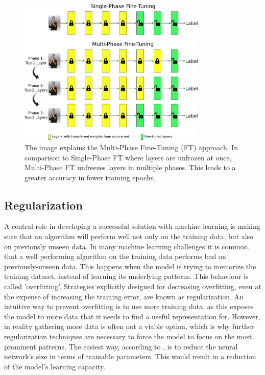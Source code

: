 \begin{figure}[H]
  \begin{center}
  \includegraphics[angle=0, width=0.8\textwidth]{Figures/MultiPhaseFT.pdf}
  \caption[Multi-Phase Fine-Tuning overview]{The image explains the Multi-Phase Fine-Tuning (FT) \citep{Sarhan:2020:MultiPhaseFineTuning} approach. In comparison to Single-Phase FT where layers are unfrozen at once, Multi-Phase FT unfreezes layers in multiple phases. This leads to a greater accuracy in fewer training epochs.}
  \label{fig:MultiPhaseFT}
  \end{center}
\end{figure}

\subsection{Regularization}
A central role in developing a successful solution with machine learning is making sure that an algorithm will perform well not only on the training data, but also on previously unseen data. In many machine learning challenges it is common, that a well performing algorithm on the training data performs bad on previously-unseen data. This happens when the model is trying to memorize the training dataset, instead of learning its underlying patterns. This behaviour is called 'overfitting'. Strategies explicitly designed for decreasing overfitting, even at the expense of increasing the training error, are known as regularization. \citep{Goodfellow:2016:DeepLearning}
\newline\newline
An intuitive way to prevent overfitting is to use more training data, as this exposes the model to more data that it needs to find a useful representation for. However, in reality gathering more data is often not a viable option, which is why further regularization techniques are necessary to force the model to focus on the most prominent patterns. The easiest way, according to \citet{Chollet:2017:DeepLearningPython}, is to reduce the neural network's size in terms of trainable parameters. This would result in a reduction of the model's learning capacity.

